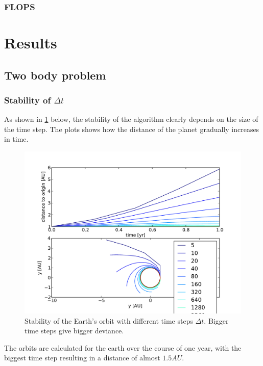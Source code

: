 \documentclass[10pt]{article}
\begin{document}
\begin{multicols}{2}
\subsubsection{FLOPS}

\section{Results}
\subsection{Two body problem}
\subsubsection{Stability of $\Delta t$}
As shown in \cref{fig:stab_euler} below, the stability of the algorithm
clearly depends on the size of the time step. The plots shows how the
distance of the planet gradually increases in time.  

\begin{figure}[H]
    \centering
    \includegraphics[width=1.0\linewidth]{../results/stability_orbits.pdf}
    \caption{Stability of the Earth's orbit with different time steps $\Delta t$. Bigger time steps give bigger deviance.}
    \label{fig:stab_euler}
\end{figure}

The orbits are calculated for the earth over the course of one year, with
the biggest time step resulting in a distance of almost $1.5AU$.


\end{multicols}
\end{document}
